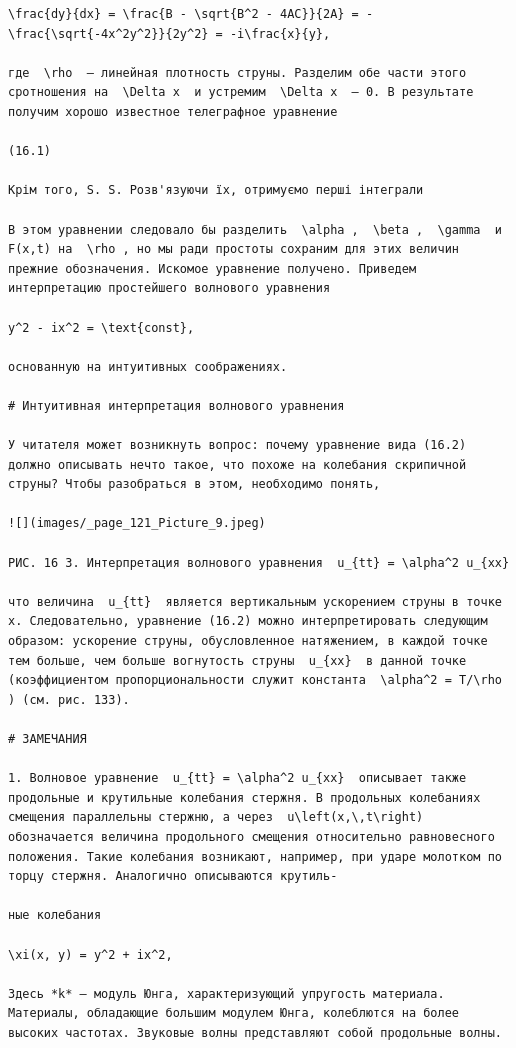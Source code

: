 \documentclass[
  ukrainian,
]{article}
\begin{document}
\begin{verbatim}
\frac{dy}{dx} = \frac{B - \sqrt{B^2 - 4AC}}{2A} = -\frac{\sqrt{-4x^2y^2}}{2y^2} = -i\frac{x}{y},

где  \rho  — линейная плотность струны. Разделим обе части этого сротношения на  \Delta x  и устремим  \Delta x  — 0. В результате получим хорошо известное телеграфное уравнение

(16.1)

Крім того, S. S. Розв'язуючи їх, отримуємо перші інтеграли

В этом уравнении следовало бы разделить  \alpha ,  \beta ,  \gamma  и F(x,t) на  \rho , но мы ради простоты сохраним для этих величин прежние обозначения. Искомое уравнение получено. Приведем интерпретацию простейшего волнового уравнения

y^2 - ix^2 = \text{const},

основанную на интуитивных соображениях.

# Интуитивная интерпретация волнового уравнения

У читателя может возникнуть вопрос: почему уравнение вида (16.2) должно описывать нечто такое, что похоже на колебания скрипичной струны? Чтобы разобраться в этом, необходимо понять,

![](images/_page_121_Picture_9.jpeg)

РИС. 16 3. Интерпретация волнового уравнения  u_{tt} = \alpha^2 u_{xx} 

что величина  u_{tt}  является вертикальным ускорением струны в точке x. Следовательно, уравнение (16.2) можно интерпретировать следующим образом: ускорение струны, обусловленное натяжением, в каждой точке тем больше, чем больше вогнутость струны  u_{xx}  в данной точке (коэффициентом пропорциональности служит константа  \alpha^2 = T/\rho ) (см. рис. 133).

# ЗАМЕЧАНИЯ

1. Волновое уравнение  u_{tt} = \alpha^2 u_{xx}  описывает также продольные и крутильные колебания стержня. В продольных колебаниях смещения параллельны стержню, а через  u\left(x,\,t\right)  обозначается величина продольного смещения относительно равновесного положения. Такие колебания возникают, например, при ударе молотком по торцу стержня. Аналогично описываются крутиль-

ные колебания

\xi(x, y) = y^2 + ix^2,

Здесь *k* — модуль Юнга, характеризующий упругость материала. Материалы, обладающие большим модулем Юнга, колеблются на более высоких частотах. Звуковые волны представляют собой продольные волны.


\end{verbatim}
\end{document}
